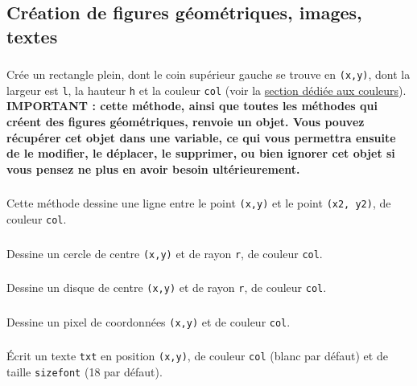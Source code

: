 \documentclass[11pt,a4paper]{article}
\begin{document}
\subsection*{Création de figures géométriques, images, textes}

\subsubsection*{}
Crée un rectangle plein, dont le coin supérieur gauche se trouve en {\tt (x,y)}, dont la largeur est {\tt l}, la hauteur {\tt h} et la couleur {\tt col} (voir la \underline{section dédiée aux couleurs}).\\

{\bf IMPORTANT : cette méthode, ainsi que toutes les méthodes qui créent des figures géométriques, renvoie un objet. Vous pouvez récupérer cet objet dans une variable, ce qui vous permettra ensuite de le modifier, le déplacer, le supprimer, ou bien ignorer cet objet si vous pensez ne plus en avoir besoin ultérieurement.}

\subsubsection*{}
Cette méthode dessine une ligne entre le point {\tt (x,y)} et le point {\tt (x2, y2)}, de couleur {\tt col}.

\subsubsection*{}
Dessine un cercle de centre {\tt (x,y)} et de rayon {\tt r}, de couleur {\tt col}.

\subsubsection*{}
Dessine un disque de centre {\tt (x,y)} et de rayon {\tt r}, de couleur {\tt col}.

\subsubsection*{}
Dessine un pixel de coordonnées {\tt (x,y)} et de couleur {\tt col}.

\subsubsection*{}
\'Ecrit un texte {\tt txt} en position {\tt (x,y)}, de couleur {\tt col} (blanc par défaut) et de taille {\tt sizefont} (18 par défaut).
\end{document}
